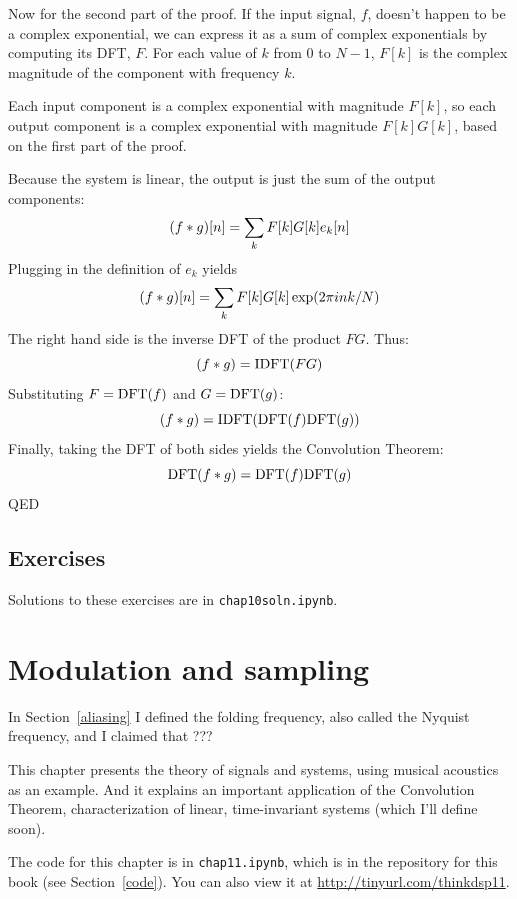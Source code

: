 \documentclass[12pt]{book}
\begin{document}
Now for the second part of the proof.  If the input signal, $f$, doesn't
happen to be a complex exponential, we can express it as a sum of
complex exponentials by computing its DFT, $F$.
For each value of $k$ from 0 to $N-1$, $F[k]$ is the complex
magnitude of the component with frequency $k$.

Each input component is a complex exponential with magnitude
$F[k]$, so each output component is a complex
exponential with magnitude $F[k]G[k]$, based on the first part of
the proof.

Because the system is linear, the output is just the sum of the
output components:
%
\[ (f \ast g)[n] = \sum_k F[k] G[k] e_k[n] \]
%
Plugging in the definition of $e_k$ yields
%
\[ (f \ast g)[n] = \sum_k F[k] G[k] \exp(2 \pi i n k / N) \]
%
The right hand side is the inverse DFT of the product $F G$.  Thus:
%
\[ (f \ast g) = \mathrm{IDFT}( F G ) \]
%
Substituting $F = \mathrm{DFT}(f)$ and $G = \mathrm{DFT}(g)$:
%
\[ (f \ast g) = \mathrm{IDFT}( \mathrm{DFT}(f) \mathrm{DFT}(g) ) \]
%
Finally, taking the DFT of both sides yields the Convolution Theorem:
%
\[ \mathrm{DFT}(f \ast g) = \mathrm{DFT}(f) \mathrm{DFT}(g) \]
%
QED


\section{Exercises}

\begin{exercise}
\end{exercise}

\begin{exercise}
\end{exercise}

Solutions to these exercises are in {\tt chap10soln.ipynb}.


\chapter{Modulation and sampling}

In Section~\ref{aliasing} I defined the folding frequency, also called
the Nyquist frequency, and I claimed that ???

This chapter presents the theory of signals and systems, using
musical acoustics as an example.  And it explains an
important application of the Convolution Theorem, characterization
of linear, time-invariant systems (which I'll define soon).

The code for this chapter is in {\tt chap11.ipynb}, which is in the
repository for this book (see Section~\ref{code}).
You can also view it at \url{http://tinyurl.com/thinkdsp11}.
\end{document}
